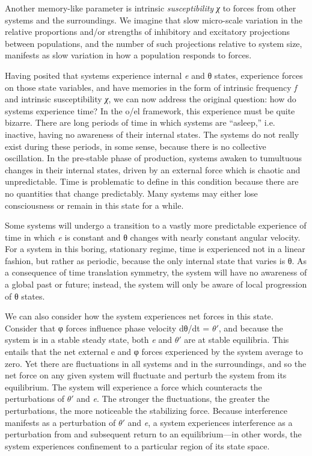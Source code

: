   Another memory-like parameter is intrinsic \textit{susceptibility} \textit{χ} to forces from other systems and the surroundings. We imagine that slow micro-scale variation in the relative proportions and/or strengths of inhibitory and excitatory projections between populations, and the number of such projections relative to system size, manifests as slow variation in how a population responds to forces.

  Having posited that systems experience internal \textit{e} and θ states, experience forces on those state variables, and have memories in the form of intrinsic frequency \textit{f} and intrinsic susceptibility \textit{χ}, we can now address the original question: how do systems experience time? In the o/el framework, this experience must be quite bizarre. There are long periods of time in which systems are “asleep,” i.e. inactive, having no awareness of their internal states. The systems do not really exist during these periods, in some sense, because there is no collective oscillation. In the pre-stable phase of production, systems awaken to tumultuous changes in their internal states, driven by an external force which is chaotic and unpredictable. Time is problematic to define in this condition because there are no quantities that change predictably. Many systems may either lose consciousness or remain in this state for a while. 

  Some systems will undergo a transition to a vastly more predictable experience of time in which \textit{e} is constant and θ changes with nearly constant angular velocity. For a system in this boring, stationary regime, time is experienced not in a linear fashion, but rather as periodic, because the only internal state that varies is θ. As a consequence of time translation symmetry, the system will have no awareness of a global past or future; instead, the system will only be aware of local progression of θ states. 

  We can also consider how the system experiences net forces in this state. Consider that φ forces influence phase velocity dθ/dt = $\theta ′$, and because the system is in a stable steady state, both \textit{e} and $\theta ′$ are at stable equilibria. This entails that the net external e and φ forces experienced by the system average to zero. Yet there are fluctuations in all systems and in the surroundings, and so the net force on any given system will fluctuate and perturb the system from its equilibrium. The system will experience a force which counteracts the perturbations of $\theta ′$ and \textit{e}. The stronger the fluctuations, the greater the perturbations, the more noticeable the stabilizing force. Because interference manifests as a perturbation of $\theta ′$ and \textit{e}, a system experiences interference as a perturbation from and subsequent return to an equilibrium—in other words, the system experiences confinement to a particular region of its state space.

